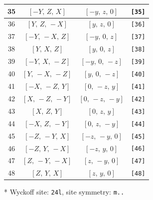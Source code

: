 \documentclass[fleqn,8pt]{jsarticle}
\begin{document}
\begin{longtable}{cccc}
35 & $\left[ - Y,\, Z,\, X \right]$ & $\left[ - y,\, z,\, 0 \right]$ & {\tt [35]} \\ \hline
36 & $\left[ Y,\, Z,\, - X \right]$ & $\left[ y,\, z,\, 0 \right]$ & {\tt [36]} \\ \hline
37 & $\left[ - Y,\, - X,\, Z \right]$ & $\left[ - y,\, 0,\, z \right]$ & {\tt [37]} \\ \hline
38 & $\left[ Y,\, X,\, Z \right]$ & $\left[ y,\, 0,\, z \right]$ & {\tt [38]} \\ \hline
39 & $\left[ - Y,\, X,\, - Z \right]$ & $\left[ - y,\, 0,\, - z \right]$ & {\tt [39]} \\ \hline
40 & $\left[ Y,\, - X,\, - Z \right]$ & $\left[ y,\, 0,\, - z \right]$ & {\tt [40]} \\ \hline
41 & $\left[ - X,\, - Z,\, Y \right]$ & $\left[ 0,\, - z,\, y \right]$ & {\tt [41]} \\ \hline
42 & $\left[ X,\, - Z,\, - Y \right]$ & $\left[ 0,\, - z,\, - y \right]$ & {\tt [42]} \\ \hline
43 & $\left[ X,\, Z,\, Y \right]$ & $\left[ 0,\, z,\, y \right]$ & {\tt [43]} \\ \hline
44 & $\left[ - X,\, Z,\, - Y \right]$ & $\left[ 0,\, z,\, - y \right]$ & {\tt [44]} \\ \hline
45 & $\left[ - Z,\, - Y,\, X \right]$ & $\left[ - z,\, - y,\, 0 \right]$ & {\tt [45]} \\ \hline
46 & $\left[ - Z,\, Y,\, - X \right]$ & $\left[ - z,\, y,\, 0 \right]$ & {\tt [46]} \\ \hline
47 & $\left[ Z,\, - Y,\, - X \right]$ & $\left[ z,\, - y,\, 0 \right]$ & {\tt [47]} \\ \hline
48 & $\left[ Z,\, Y,\, X \right]$ & $\left[ z,\, y,\, 0 \right]$ & {\tt [48]} \\
\end{longtable}
* Wyckoff site: {\tt 24l}, site symmetry: {\tt m..}
\renewcommand{\arraystretch}{1.2}
\end{document}
